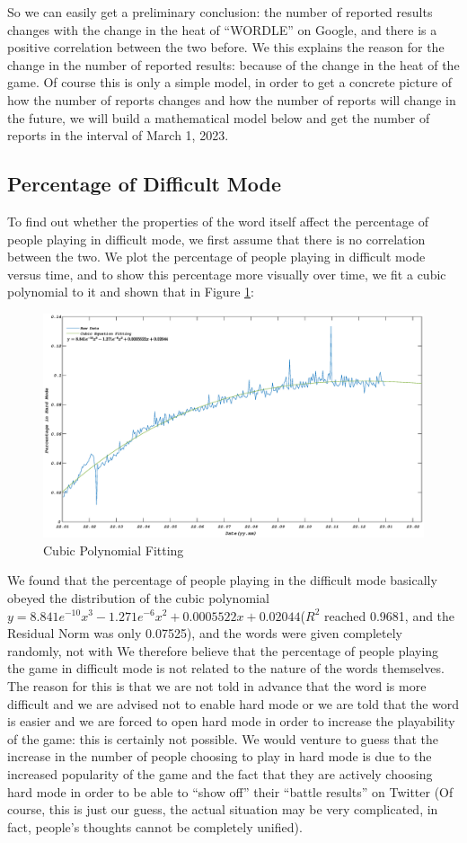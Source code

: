 \documentclass[12pt]{article}  %
\begin{document}
So we can easily get a preliminary conclusion: the number of reported results changes with the change in the heat of ``WORDLE'' on Google, and there is a positive correlation between the two before. We this explains the reason for the change in the number of reported results: because of the change in the heat of the game. Of course this is only a simple model, in order to get a concrete picture of how the number of reports changes and how the number of reports will change in the future, we will build a mathematical model below and get the number of reports in the interval of March 1, 2023.
\subsection{Percentage of Difficult Mode}
To find out whether the properties of the word itself affect the percentage of people playing in difficult mode, we first assume that there is no correlation between the two. We plot the percentage of people playing in difficult mode versus time, and to show this percentage more visually over time, we fit a cubic polynomial to it and shown that in Figure \ref{sancinihe}:
\begin{figure}[htbp]
\centering
\includegraphics[width=\textwidth]{img/sanci.eps}
\caption{Cubic Polynomial Fitting}\label{sancinihe}
\end{figure}

We found that the percentage of people playing in the difficult mode basically obeyed the distribution of the cubic polynomial $y=8.841e^{-10}x^3-1.271e^{-6}x^2+0.0005522x+0.02044$($R^2$ reached 0.9681, and the Residual Norm was only 0.07525), and the words were given completely randomly, not with We therefore believe that the percentage of people playing the game in difficult mode is not related to the nature of the words themselves. The reason for this is that we are not told in advance that the word is more difficult and we are advised not to enable hard mode or we are told that the word is easier and we are forced to open hard mode in order to increase the playability of the game: this is certainly not possible. We would venture to guess that the increase in the number of people choosing to play in hard mode is due to the increased popularity of the game and the fact that they are actively choosing hard mode in order to be able to ``show off'' their ``battle results'' on Twitter (Of course, this is just our guess, the actual situation may be very complicated, in fact, people's thoughts cannot be completely unified).
\end{document}
